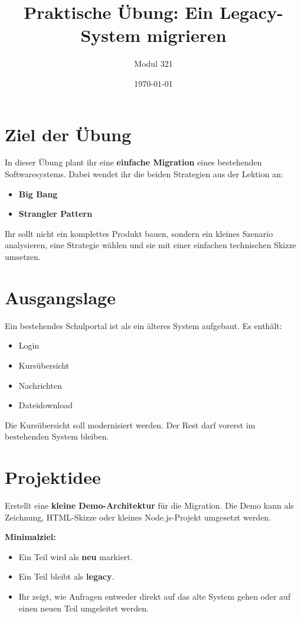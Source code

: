 \documentclass[a4paper,12pt]{article}
\title{Praktische Übung: Ein Legacy-System migrieren}
\author{Modul 321}
\date{\today}
\begin{document}
\maketitle

\section*{Ziel der Übung}

In dieser Übung plant ihr eine \textbf{einfache Migration} eines bestehenden
Softwaresystems. Dabei wendet ihr die beiden Strategien aus der Lektion an:

\begin{itemize}
\item \textbf{Big Bang}
\item \textbf{Strangler Pattern}
\end{itemize}

Ihr sollt nicht ein komplettes Produkt bauen, sondern ein kleines Szenario
analysieren, eine Strategie wählen und sie mit einer einfachen technischen
Skizze umsetzen.

\section*{Ausgangslage}

Ein bestehendes Schulportal ist als ein älteres System aufgebaut.
Es enthält:

\begin{itemize}
\item Login
\item Kursübersicht
\item Nachrichten
\item Dateidownload
\end{itemize}

Die Kursübersicht soll modernisiert werden.
Der Rest darf vorerst im bestehenden System bleiben.

\section*{Projektidee}

Erstellt eine \textbf{kleine Demo-Architektur} für die Migration.
Die Demo kann als Zeichnung, HTML-Skizze oder kleines Node.js-Projekt umgesetzt werden.

\textbf{Minimalziel:}
\begin{itemize}
\item Ein Teil wird als \textbf{neu} markiert.
\item Ein Teil bleibt als \textbf{legacy}.
\item Ihr zeigt, wie Anfragen entweder direkt auf das alte System gehen
      oder auf einen neuen Teil umgeleitet werden.
\end{itemize}
\end{document}
